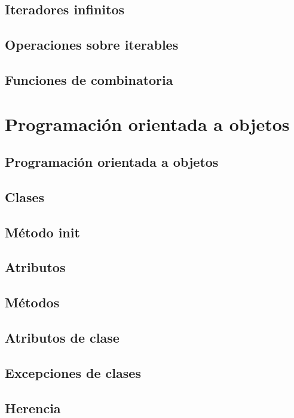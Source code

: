\documentclass{article}
\begin{document}
\subsection{Iteradores infinitos}

\subsection{Operaciones sobre iterables}

\subsection{Funciones de combinatoria}

\section{Programación orientada a objetos}

\subsection{Programación orientada a objetos}

\subsection{Clases}

\subsection{Método init}

\subsection{Atributos}

\subsection{Métodos}

\subsection{Atributos de clase}

\subsection{Excepciones de clases}

\subsection{Herencia}
\end{document}
